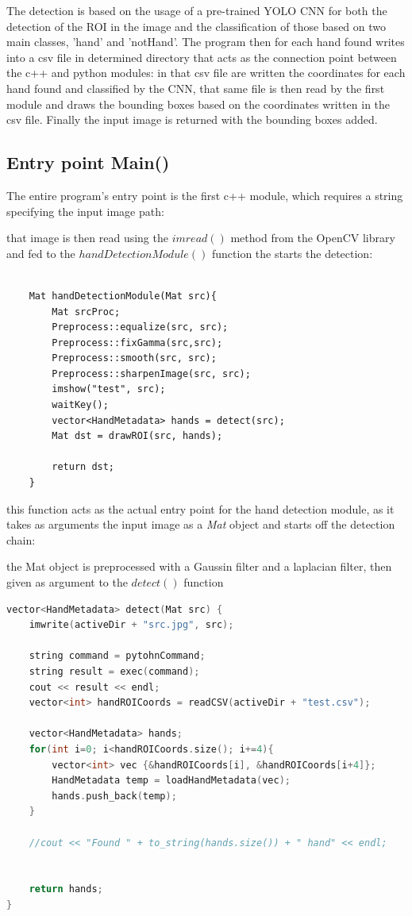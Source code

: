 The detection is based on the usage of a pre-trained YOLO CNN for both the
detection of the ROI in the image and the classification
of those based on two main classes, 'hand' and 'notHand'. The program then for
each hand found writes into a csv file in determined
directory that acts as the connection point between the c++ and python modules:
in that csv file are written the coordinates for each hand found and classified
by the CNN, that same file is then read by the first module and draws the
bounding boxes based on the coordinates written in the csv file. Finally the
input image is
returned with the bounding boxes added.

\subsection{Entry point Main()}

The entire program's entry point is the first c++ module, which requires a
string specifying the input image path:

that image is then read using the $imread()$ method from the OpenCV library and
fed to the $handDetectionModule()$ function the starts the detection:

\begin{lstlisting}

    Mat handDetectionModule(Mat src){
        Mat srcProc;
        Preprocess::equalize(src, src);
        Preprocess::fixGamma(src,src);
        Preprocess::smooth(src, src);
        Preprocess::sharpenImage(src, src);
        imshow("test", src);
        waitKey();
        vector<HandMetadata> hands = detect(src);
        Mat dst = drawROI(src, hands);
    
        return dst;
    }

\end{lstlisting}
this function acts as the actual entry point for the hand detection module, as
it takes as arguments the input image as a \textit{Mat} object and
starts off the detection chain:

the Mat object is preprocessed with a Gaussin filter and a laplacian filter,
then given as argument to the $detect()$ function

\begin{lstlisting}[language = c++]
    vector<HandMetadata> detect(Mat src) {
    imwrite(activeDir + "src.jpg", src);

    string command = pytohnCommand;
    string result = exec(command);
    cout << result << endl;
    vector<int> handROICoords = readCSV(activeDir + "test.csv");

    vector<HandMetadata> hands;
    for(int i=0; i<handROICoords.size(); i+=4){
        vector<int> vec {&handROICoords[i], &handROICoords[i+4]};
        HandMetadata temp = loadHandMetadata(vec);
        hands.push_back(temp);
    }
    
    //cout << "Found " + to_string(hands.size()) + " hand" << endl;
    
    
    return hands;
}
\end{lstlisting}

